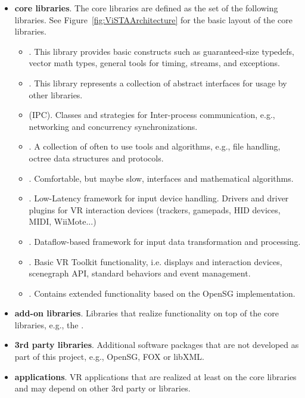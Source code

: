 \begin{itemize}

\item \textbf{ core libraries}. The  core libraries are defined as the set of the following libraries. See Figure~\ref{fig:ViSTAArchitecture} for the basic layout of the  core libraries.
  \begin{itemize}
  \item {}. 
    This library provides basic constructs such as guaranteed-size typedefs, vector math types, general tools for timing, streams, and exceptions.
  \item {}. 
    This library represents a collection of abstract interfaces for usage by other libraries.
  \item {} (IPC).
  	Classes and strategies for Inter-process communication, e.g., networking and concurrency synchronizations.
  \item {}.
  	A collection of often to use tools and algorithms, e.g., file handling, octree data structures and protocols.
  \item {}.
  	Comfortable, but maybe slow, interfaces and mathematical algorithms.
  \item {}.
  	Low-Latency framework for input device handling. Drivers and driver plugins for VR interaction devices (trackers, gamepads, HID devices, MIDI, WiiMote...)
  \item {}.
  	Dataflow-based framework for input data transformation and processing.
  \item {}.
  	Basic VR Toolkit functionality, i.e. displays and interaction devices, scenegraph API, standard behaviors and event management.
  \item {}.
  	Contains extended functionality based on the OpenSG implementation.
  \end{itemize}

\item \textbf{ add-on libraries}.
  Libraries that realize functionality on top of the  core libraries, e.g., the .

\item \textbf{3rd party libraries}.
  Additional software packages that are not developed as part of this project, e.g., OpenSG, FOX or libXML.

\item \textbf{ applications}.
  VR applications that are realized at least on the  core libraries and may depend on other 3rd party or  libraries.

\end{itemize}

